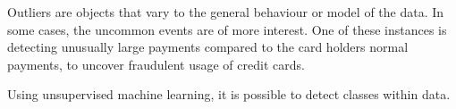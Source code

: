 Outliers are objects that vary to the general behaviour or model of the data. In some cases, the uncommon events are of more interest. One of these instances is detecting unusually large payments compared to the card holders normal payments, to uncover fraudulent usage of credit cards.

Using unsupervised machine learning, it is possible to detect classes within data.



